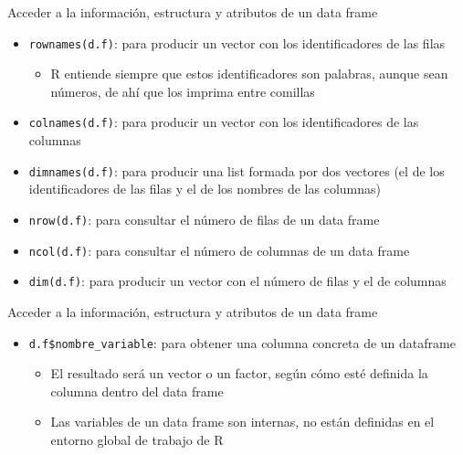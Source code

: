 \documentclass[
  ignorenonframetext,
  aspectratio=169]{beamer}
\providecommand{\tightlist}{%
  \setlength{\itemsep}{0pt}\setlength{\parskip}{0pt}}
\begin{document}
\begin{frame}[fragile]{Acceder a la información, estructura y atributos
de un data frame}
\protect\hypertarget{acceder-a-la-informaciuxf3n-estructura-y-atributos-de-un-data-frame-3}{}
\begin{itemize}
\tightlist
\item
  \texttt{rownames(d.f)}: para producir un vector con los
  identificadores de las filas

  \begin{itemize}
  \tightlist
  \item
    R entiende siempre que estos identificadores son palabras, aunque
    sean números, de ahí que los imprima entre comillas
  \end{itemize}
\item
  \texttt{colnames(d.f)}: para producir un vector con los
  identificadores de las columnas
\item
  \texttt{dimnames(d.f)}: para producir una list formada por dos
  vectores (el de los identificadores de las filas y el de los nombres
  de las columnas)
\item
  \texttt{nrow(d.f)}: para consultar el número de filas de un data frame
\item
  \texttt{ncol(d.f)}: para consultar el número de columnas de un data
  frame
\item
  \texttt{dim(d.f)}: para producir un vector con el número de filas y el
  de columnas
\end{itemize}
\end{frame}

\begin{frame}[fragile]{Acceder a la información, estructura y atributos
de un data frame}
\protect\hypertarget{acceder-a-la-informaciuxf3n-estructura-y-atributos-de-un-data-frame-4}{}
\begin{itemize}
\tightlist
\item
  \texttt{d.f\$nombre\_variable}: para obtener una columna concreta de
  un dataframe

  \begin{itemize}
  \tightlist
  \item
    El resultado será un vector o un factor, según cómo esté definida la
    columna dentro del data frame
  \item
    Las variables de un data frame son internas, no están definidas en
    el entorno global de trabajo de R
  \end{itemize}
\end{itemize}
\end{frame}
\end{document}
